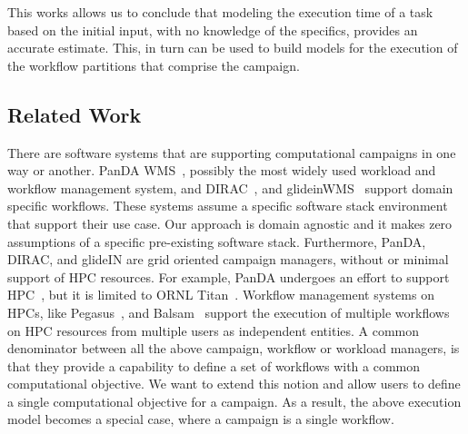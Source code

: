 This works allows us to conclude that modeling the execution time of a task 
based on the initial input, with no knowledge of the specifics, provides an 
accurate estimate. This, in turn can be used to build models for the execution 
of the workflow partitions that comprise the campaign.

\subsection{Related Work}

There are software systems that are supporting computational campaigns in one way or another. 
PanDA WMS~\cite{maeno2008panda,maeno2014evolution}, possibly the most widely used workload and workflow management system, and DIRAC~\cite{casajus2010dirac}, and glideinWMS~\cite{sfiligoi2008glidein} support domain specific workflows.
These systems assume a specific software stack environment that support their use case.
Our approach is domain agnostic and it makes zero assumptions of a specific pre-existing software stack. 
Furthermore, PanDA, DIRAC, and glideIN are grid oriented campaign managers, without or minimal support of HPC resources.
For example, PanDA undergoes an effort to support HPC~\cite{de2016accelerating}, but it is limited to ORNL Titan~\cite{titan}.
Workflow management systems on HPCs, like Pegasus~\cite{deelman2015pegasus}, and Balsam~\cite{salim2019balsam} support the execution of multiple workflows on HPC resources from multiple users as independent entities.
A common denominator between all the above campaign, workflow or workload managers, is that they provide a capability to define a set of workflows with a common computational objective.
We want to extend this notion and allow users to define a single computational objective for a campaign.
As a result, the above execution model becomes a special case, where a campaign is a single workflow.
